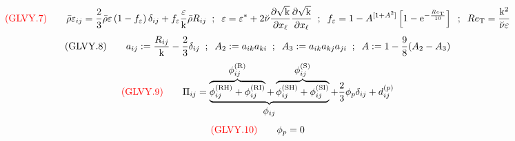\documentclass{article}
\begin{document}
\begin{equation}
{\color{red}{({\rm GLVY}.7)}}\qquad
\bar\rho\varepsilon_{ij}=\frac{2}{3}\bar\rho\varepsilon\left(1-f_\varepsilon\right)\delta_{ij}+f_\varepsilon\frac{\varepsilon}{\mathrm{k}}\bar\rho R_{ij}\;\; ; \;\;
\varepsilon=\varepsilon^*+2\breve\nu\frac{\partial \sqrt{\mathrm{k}}}{\partial x_\ell}
                                     \frac{\partial \sqrt{\mathrm{k}}}{\partial x_\ell}\;\; ; \;\;
f_\varepsilon=1-A^{[1+A^2]}\left[1-\mathrm{e}^{-\frac{Re_{\mathrm{\tiny T}}}{10}}\right]\;\; ; \;\;
Re_{\mathrm{\tiny T}} =\frac{\mathrm{k}^2        }
                          {\breve\nu\varepsilon}
\end{equation}
\begin{equation}
({\rm GLVY}.8)\qquad
a_{ij}:=\frac{R_{ij}}{\mathrm{k}}-\frac{2}{3}\delta_{ij}\;\; ; \;\;
A_2:=a_{ik}a_{ki}\;\; ; \;\;
A_3:=a_{ik}a_{kj}a_{ji}\;\; ; \;\;
A:=1-\frac{9}{8}(A_2-A_3)
\end{equation}
\begin{equation}
{\color{red}{({\rm GLVY}.9)}}\qquad
\Pi_{ij}=\underbrace{\overbrace{\phi_{ij}^{(\mathrm{\tiny RH})}+\phi_{ij}^{(\mathrm{\tiny RI})}}^{\displaystyle\phi_{ij}^{(\mathrm{\tiny R})}}+
                     \overbrace{\phi_{ij}^{(\mathrm{\tiny SH})}+\phi_{ij}^{(\mathrm{\tiny SI})}}^{\displaystyle\phi_{ij}^{(\mathrm{\tiny S})}}}_{\displaystyle\phi_{ij}}+\frac{2}{3}\phi_p\delta_{ij}+d_{ij}^{(p)}
\end{equation}
\begin{equation}
{\color{red}{({\rm GLVY}.10)}}\qquad
\phi_p=0
\end{equation}
\end{document}
